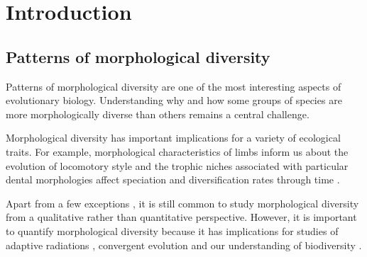\chapter{Introduction}
\label{chap:introduction}





\noindent

\section{Patterns of morphological diversity}

	Patterns of morphological diversity are one of the most interesting aspects of evolutionary biology. %
	Understanding why and how some groups of species are more morphologically diverse than others remains a central challenge. 
	
	Morphological diversity has important implications for a variety of ecological traits. For example, morphological characteristics of limbs inform us about the evolution of locomotory style \citep[e.g.][]{Bou1987} and the trophic niches associated with particular dental morphologies affect speciation and diversification rates through time \citep{Price2012}.
	
	Apart from a few exceptions \citep[e.g.][]{Brusatte2008, Goswami2011, Ruta2013}, it is still common to study morphological diversity from a qualitative rather than quantitative perspective. However, it is important to quantify morphological diversity because it has implications for studies of adaptive radiations \citep{Losos2010}, convergent evolution \citep[e.g.][]{Muschick2012, Harmon2005} and our understanding of biodiversity \citep{Roy1997}.

